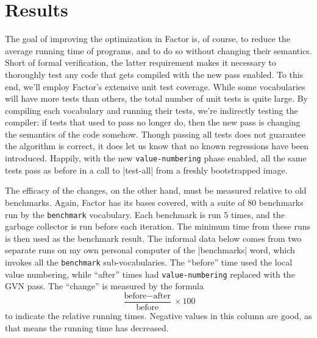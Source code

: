 \section{Results}\label{sec:vn:results}

The goal of improving the optimization in Factor is, of course, to reduce the
average running time of programs, and to do so without changing their
semantics.  Short of formal verification, the latter requirement makes it
necessary to thoroughly test any code that gets compiled with the new pass
enabled.  To this end, we'll employ Factor's extensive unit test coverage.
While some vocabularies will have more tests than others, the total number of
unit tests is quite large.  By compiling each vocabulary and running their
tests, we're indirectly testing the compiler: if tests that used to pass no
longer do, then the new pass is changing the semantics of the code somehow.
Though passing all tests does not guarantee the algorithm is correct, it does
let us know that no known regressions have been introduced.  Happily, with the
new \Verb|value-numbering| phase enabled, all the same tests pass as before in
a call to \factor|test-all| from a freshly bootstrapped image.

The efficacy of the changes, on the other hand, must be measured relative to
old benchmarks.  Again, Factor has its bases covered, with a suite of $80$
benchmarks run by the \Verb|benchmark| vocabulary.  Each benchmark is run $5$
times, and the garbage collector is run before each iteration.  The minimum
time from these runs is then used as the benchmark result.  The informal data
below comes from two separate runs on my own personal computer of the
\factor|benchmarks| word, which invokes all the \Verb|benchmark|
sub-vocabularies.  The ``before'' time used the local value numbering, while
``after'' times had \Verb|value-numbering| replaced with the \gls{GVN} pass.
The ``change'' is measured by the formula
%
$$\frac{\text{before} - \text{after}}{\text{before}} \times 100$$
%
to indicate the relative running times.  Negative values in this column are
good, as that means the running time has decreased.

